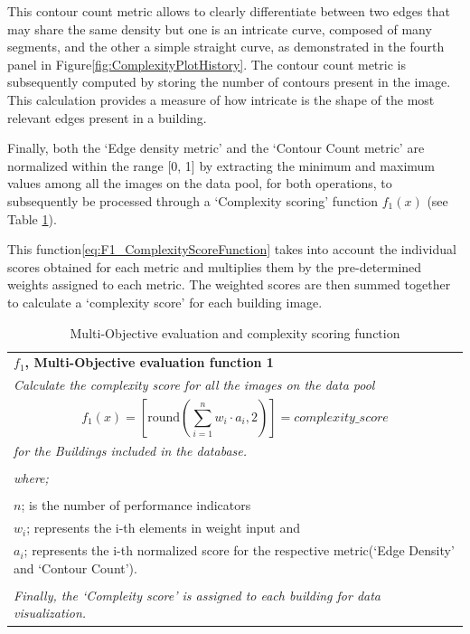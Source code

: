 This contour count metric allows to clearly differentiate between two edges that may share the same density but one is an intricate curve, composed of many segments, and the other a simple straight curve, as demonstrated in the fourth panel in Figure\ref{fig:ComplexityPlotHistory}.
The contour count metric  is subsequently computed by storing the number of contours present in the image.
This calculation provides a measure of how intricate is the shape of the most relevant edges present in a building.

Finally, both the `Edge density metric' and the `Contour Count metric' are normalized within the range [0, 1] by extracting the minimum and maximum values among all the images on the data pool, for both operations, to subsequently be processed through a `Complexity scoring' function \(f_1(x)\) (see Table \ref{tab:ComplexityScoreFunction_table}).

This function\ref{eq:F1_ComplexityScoreFunction} takes into account the individual scores obtained for each metric and multiplies them by the pre-determined weights assigned to each metric.
The weighted scores are then summed together to calculate a `complexity score' for each building image.

    \begin{table}[htb]
        \caption{Multi-Objective evaluation and complexity scoring function }
        \label{tab:ComplexityScoreFunction_table}
        \centering
        \small
        \begin{tabular}{|p{8cm}|}
        \hline
            \textbf{\(f_1\), Multi-Objective evaluation function 1}\\
            \textit{Calculate the complexity score for all the images on the data pool}
            \\
            \begin{equation}
                f_1(x) = \left[ \mathrm{round}\left(\sum_{i=1}^{n} w_i \cdot a_i, 2\right) \right] = complexity\_score
            \label{eq:F1_ComplexityScoreFunction}
            \end{equation}

            \\
            \textit{ for the Buildings included in the database.}\\
            \\
            \textit{where;} \\
            \\
            \(n \); is the number of performance indicators \\
            \(w_i \); represents the i-th elements in weight input and \\
            \(a_i \); represents the i-th normalized score for the respective metric(`Edge Density' and `Contour Count').\\
            \\

            \textit{Finally, the `Compleity score' is assigned to each building for data visualization.}\\
        \hline
        \end{tabular}
    \end{table}

